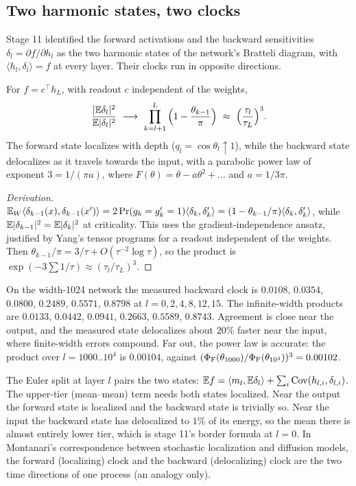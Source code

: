 \subsection{Two harmonic states, two clocks}
Stage 11 identified the forward activations and the backward sensitivities $\delta_l=\partial f/\partial h_l$ as the two harmonic states of
the network's Bratteli diagram, with $\langle h_l,\delta_l\rangle=f$ at every layer. Their clocks run in opposite directions.
\begin{proposition}\label{prop:backclock}
For $f=c^{\top}h_L$, with readout $c$ independent of the weights,
\[
\frac{|\E\delta_l|^2}{\E|\delta_l|^2}\ \longrightarrow\ \prod_{k=l+1}^{L}\Big(1-\frac{\theta_{k-1}}\pi\Big)\ \approx\ \Big(\frac{\tau_l}{\tau_L}\Big)^3 .
\]
The forward state localizes with depth ($q_l=\cos\theta_l\uparrow1$), while the backward state delocalizes as it travels towards the input,
with a parabolic power law of exponent $3=1/(\pi a)$, where $F(\theta)=\theta-a\theta^2+\dots$ and $a=1/3\pi$.
\end{proposition}
\begin{proof}[Derivation]
$\mathbb E_W\langle\delta_{k-1}(x),\delta_{k-1}(x')\rangle=2\Pr(g_k=g'_k=1)\langle\delta_k,\delta'_k\rangle=(1-\theta_{k-1}/\pi)\langle\delta_k,\delta'_k\rangle$, while
$\mathbb E|\delta_{k-1}|^2=\mathbb E|\delta_k|^2$ at criticality. This uses the gradient-independence ansatz, justified by Yang's tensor programs for a
readout independent of the weights. Then $\theta_{k-1}/\pi=3/\tau+O(\tau^{-2}\log\tau)$, so the product is $\exp(-3\sum1/\tau)\approx(\tau_l/\tau_L)^3$.
\end{proof}
On the width-1024 network the measured backward clock is $0.0108$, $0.0354$, $0.0800$, $0.2489$, $0.5571$, $0.8798$ at $l=0,2,4,8,12,15$. The
infinite-width products are $0.0133$, $0.0442$, $0.0941$, $0.2663$, $0.5589$, $0.8743$. Agreement is close near the output, and the measured state
delocalizes about $20\%$ faster near the input, where finite-width errors compound. Far out, the power law is accurate: the product
over $l=1000..10^4$ is $0.00104$, against $(\Phi_{\mathrm F}(\theta_{1000})/\Phi_{\mathrm F}(\theta_{10^4}))^3=0.00102$.

The Euler split at layer $l$ pairs the two states: $\mathbb E f=\langle m_l,\mathbb E\delta_l\rangle+\sum_i\operatorname{Cov}(h_{l,i},\delta_{l,i})$. The upper-tier
(mean--mean) term needs both states localized. Near the output the forward state is localized and the backward state is trivially so.
Near the input the backward state has delocalized to $1\%$ of its energy, so the mean there is almost entirely lower tier, which is
stage 11's border formula at $l=0$. In Montanari's correspondence between stochastic localization and diffusion models, the forward
(localizing) clock and the backward (delocalizing) clock are the two time directions of one process (an analogy only).
